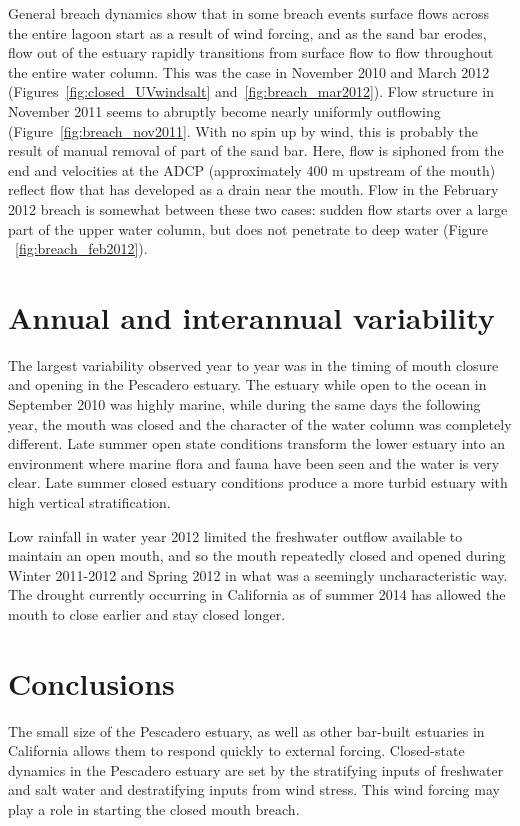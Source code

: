 General breach dynamics show that in some breach events surface flows across the entire lagoon start as a result of wind forcing, and as the sand bar erodes, flow out of the estuary rapidly transitions from surface flow to flow throughout the entire water column. This was the case in November 2010 and March 2012 (Figures~\ref{fig:closed_UVwindsalt} and~\ref{fig:breach_mar2012}). Flow structure in November 2011 seems to abruptly become nearly uniformly outflowing (Figure~\ref{fig:breach_nov2011}. With no spin up by wind, this is probably the result of manual removal of part of the sand bar. Here, flow is siphoned from the end and velocities at the ADCP (approximately 400 m upstream of the mouth) reflect flow that has developed as a drain near the mouth. Flow in the February 2012 breach is somewhat between these two cases: sudden flow starts over a large part of the upper water column, but does not penetrate to deep water (Figure ~\ref{fig:breach_feb2012}). 


\section{Annual and interannual variability} \label{sec:annvar}

The largest variability observed year to year was in the timing of mouth closure and opening in the Pescadero estuary. The estuary while open to the ocean in September 2010 was highly marine, while during the same days the following year, the mouth was closed and the character of the water column was completely different. Late summer open state conditions transform the lower estuary into an environment where marine flora and fauna have been seen and the water is very clear. Late summer closed estuary conditions produce a more turbid estuary with high vertical stratification. 

Low rainfall in water year 2012 limited the freshwater outflow available to maintain an open mouth, and so the mouth repeatedly closed and opened during Winter 2011-2012 and Spring 2012 in what was a seemingly uncharacteristic way. The drought currently occurring in California as of summer 2014 has allowed the mouth to close earlier and stay closed longer.


\section{Conclusions} \label{backofch2}
The small size of the Pescadero estuary, as well as other bar-built estuaries in California allows them to respond quickly to external forcing. Closed-state dynamics in the Pescadero estuary are set by the stratifying inputs of freshwater and salt water and destratifying inputs from wind stress. This wind forcing may play a role in starting the closed mouth breach. 


